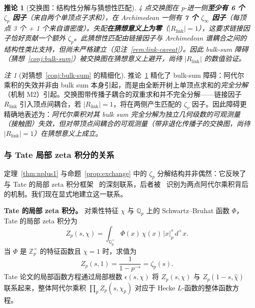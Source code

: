 \documentclass[11pt,a4paper]{ctexart}
\newtheorem{corollary}[theorem]{推论}
\theoremstyle{remark}
\newtheorem{remark}[theorem]{注}
\newcommand{\Qp}{\mathbb{Q}_p}
\newcommand{\Zp}{\mathbb{Z}_p}
\newcommand{\normp}[1]{|#1|_p}
\begin{document}
\begin{corollary}[交换图：结构性分解与猜想性匹配]
\label{cor:exchange}
4 点交换图在 p-进一侧\textbf{至少有 6 个 $\zeta_p$ 因子}（来自两个单顶点子求和），在 Archimedean 一侧有 \textbf{7 个 $\zeta_\infty$ 因子}（每顶点 3 个 + 1 个来自谱密度）。失配\textbf{在猜想意义上为零}（$|R_{\mathrm{link}}| = 1$），这要求链接因子恰好贡献一个额外 $\zeta_p$。此猜想性匹配由链接因子与 Archimedean 谱耦合之间的结构性类比支持，但\emph{尚未}严格建立（见注~\ref{rem:link-caveat}）。因此 bulk-sum 障碍（猜想~\ref{conj:bulk-sum}）被交换图\emph{在猜想意义上避开}，尚待 $|R_{\mathrm{link}}|$ 的数值验证。
\end{corollary}

\begin{remark}[对猜想~\ref{conj:bulk-sum} 的精细化]
\label{rem:refine}
推论~\ref{cor:exchange} 精化了 bulk-sum 障碍：阿代尔乘积的失效并非由 bulk sum 本身引起，而是由全断开树上单顶点求和的\emph{完全分解}（机制 M2）引起。交换图带传播子耦合的双重求和并不完全分解——链接因子 $R_{\mathrm{link}}$ 引入顶点间耦合，若 $|R_{\mathrm{link}}| = 1$，将在两侧产生匹配的 $\zeta_\nu$ 因子。因此障碍更精确地表述为：\emph{阿代尔乘积对其 bulk sum 完全分解为独立几何级数的可观测量（接触图）失效，但对带顶点间耦合的可观测量（带非退化传播子的交换图，尚待 $|R_{\mathrm{link}}| = 1$）在猜想意义上成立}。
\end{remark}

\subsubsection{与 Tate 局部 zeta 积分的关系}
\label{sec:tate-relation}

定理~\ref{thm:nplus1} 与命题~\ref{prop:exchange} 中的 $\zeta_p$ 分解结构并非偶然：它反映了与 Tate 的局部 zeta 积分框架~\cite{Tate50} 的深刻联系，后者被~\cite{HSYZ20} 识别为两点阿代尔乘积背后的机制。我们现在显式地建立这一联系。

\textbf{Tate 的局部 zeta 积分。} 对乘性特征 $\chi$ 与 $\Qp$ 上的 Schwartz--Bruhat 函数 $\Phi$，Tate 的局部 zeta 积分为
\begin{equation}
\label{eq:tate-integral}
Z_p(s, \chi) = \int_{\Qp^\times} \Phi(x)\, \chi(x)\, \normp{x}^s\, d^\times x.
\end{equation}
当 $\Phi$ 是 $\Zp^\times$ 的特征函数且 $\chi = 1$ 时，求值为
\begin{equation}
\label{eq:tate-eval}
Z_p(s, 1) = \frac{1}{1 - p^{-s}} = \zeta_p(s).
\end{equation}
Tate 论文的局部函数方程通过局部根数 $\epsilon(s, \chi)$ 将 $Z_p(s, \chi)$ 与 $Z_p(1-s, \hat{\chi})$ 联系起来，整体阿代尔乘积 $\prod_p Z_p(s, \chi_p)$ 对应于 Hecke $L$-函数的整体函数方程。
\end{document}
